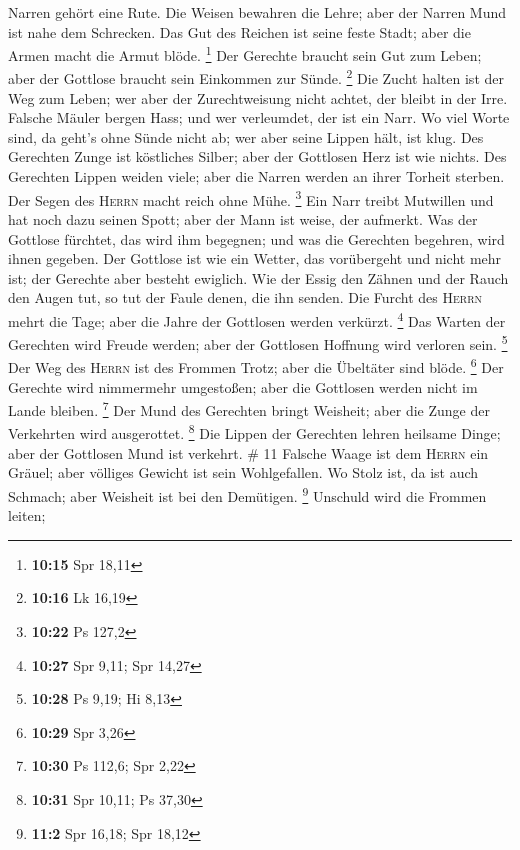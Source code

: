 Narren gehört eine Rute.  Die Weisen bewahren die Lehre;
aber der Narren Mund ist nahe dem Schrecken.  Das Gut des
Reichen ist seine feste Stadt; aber die Armen macht die Armut blöde.
\footnote{\textbf{10:15} Spr 18,11}  Der Gerechte braucht
sein Gut zum Leben; aber der Gottlose braucht sein Einkommen zur Sünde.
\footnote{\textbf{10:16} Lk 16,19}  Die Zucht halten ist
der Weg zum Leben; wer aber der Zurechtweisung nicht achtet, der bleibt
in der Irre.  Falsche Mäuler bergen Hass; und wer
verleumdet, der ist ein Narr.  Wo viel Worte sind, da
geht's ohne Sünde nicht ab; wer aber seine Lippen hält, ist klug.
 Des Gerechten Zunge ist köstliches Silber; aber der
Gottlosen Herz ist wie nichts.  Des Gerechten Lippen
weiden viele; aber die Narren werden an ihrer Torheit sterben.
 Der Segen des \textsc{Herrn} macht reich ohne Mühe.
\footnote{\textbf{10:22} Ps 127,2}  Ein Narr treibt
Mutwillen und hat noch dazu seinen Spott; aber der Mann ist weise, der
aufmerkt.  Was der Gottlose fürchtet, das wird ihm
begegnen; und was die Gerechten begehren, wird ihnen gegeben.
 Der Gottlose ist wie ein Wetter, das vorübergeht und
nicht mehr ist; der Gerechte aber besteht ewiglich.  Wie
der Essig den Zähnen und der Rauch den Augen tut, so tut der Faule
denen, die ihn senden.  Die Furcht des \textsc{Herrn}
mehrt die Tage; aber die Jahre der Gottlosen werden verkürzt.
\footnote{\textbf{10:27} Spr 9,11; Spr 14,27}  Das Warten
der Gerechten wird Freude werden; aber der Gottlosen Hoffnung wird
verloren sein. \footnote{\textbf{10:28} Ps 9,19; Hi 8,13}
 Der Weg des \textsc{Herrn} ist des Frommen Trotz; aber
die Übeltäter sind blöde. \footnote{\textbf{10:29} Spr 3,26}
 Der Gerechte wird nimmermehr umgestoßen; aber die
Gottlosen werden nicht im Lande bleiben. \footnote{\textbf{10:30} Ps
  112,6; Spr 2,22}  Der Mund des Gerechten bringt
Weisheit; aber die Zunge der Verkehrten wird ausgerottet. \footnote{\textbf{10:31}
  Spr 10,11; Ps 37,30}  Die Lippen der Gerechten lehren
heilsame Dinge; aber der Gottlosen Mund ist verkehrt. \# 11
 Falsche Waage ist dem \textsc{Herrn} ein Gräuel; aber
völliges Gewicht ist sein Wohlgefallen.  Wo Stolz ist, da
ist auch Schmach; aber Weisheit ist bei den Demütigen. \footnote{\textbf{11:2}
  Spr 16,18; Spr 18,12}  Unschuld wird die Frommen leiten;
